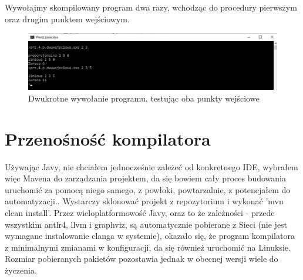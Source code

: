 Wywołajmy skompilowany program dwa razy, wchodząc do procedury pierwszym oraz drugim punktem wejściowym.
\begin{figure}[H]
    \centering
    \includegraphics[width=1.0\textwidth]{images/2.rozdzielacz/cmdzrz.png}
    \caption{Dwukrotne wywołanie programu, testując oba punkty wejściowe}
\end{figure}

\section{Przenośność kompilatora}
Używając Javy, nie chciałem jednocześnie zależeć od konkretnego IDE, wybrałem więc Mavena do zarządzania projektem, da się bowiem cały proces budowania uruchomić za pomocą niego samego, z powłoki, powtarzalnie, z potencjałem do automatyzacji.. Wystarczy sklonować projekt z repozytorium i wykonać 'mvn clean install'. Przez wieloplatformowość Javy, oraz to że zależności - przede wszystkim antlr4, llvm i graphviz, są automatycznie pobierane z Sieci (nie jest wymagane instalowanie clanga w systemie), okazało się, że program kompilatora z minimalnymi zmianami w konfiguracji, da się również uruchomić na Linuksie. Rozmiar pobieranych pakietów pozostawia jednak w obecnej wersji wiele do życzenia.
